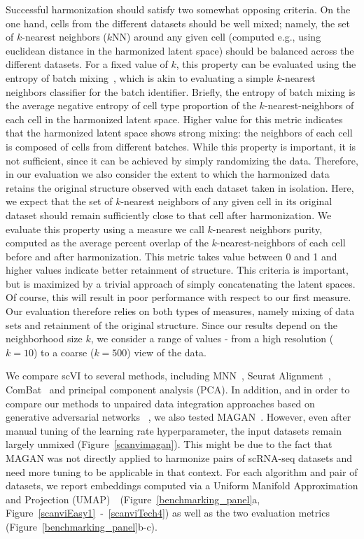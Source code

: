 Successful harmonization should satisfy two somewhat opposing criteria. On the one hand, cells from the different datasets should be well mixed; namely, the set of $k$-nearest neighbors ($k$NN) around any given cell (computed e.g., using euclidean distance in the harmonized latent space) should be balanced across the different datasets. For a fixed value of $k$, this property can be evaluated using the entropy of batch mixing~\cite{MNN}, which is akin to evaluating a simple $k$-nearest neighbors classifier for the batch identifier. Briefly, the entropy of batch mixing is the average negative entropy of cell type proportion of the $k$-nearest-neighbors of each cell in the harmonized latent space. Higher value for this metric indicates that the harmonized latent space shows strong mixing: the neighbors of each cell is composed of cells from different batches. While this property is important, it is not sufficient, since it can be achieved by simply randomizing the data. Therefore, in our evaluation we also consider the extent to which the harmonized data retains the original structure observed with each dataset taken in isolation. Here, we expect that the set of $k$-nearest neighbors of any given cell in its original dataset should remain sufficiently close to that cell after harmonization. We evaluate this property using a measure we call $k$-nearest neighbors purity, computed as the average percent overlap of the $k$-nearest-neighbors of each cell before and after harmonization. This metric takes value between 0 and 1 and higher values indicate better retainment of structure. This criteria is important, but is maximized by a trivial approach of simply concatenating the latent spaces. Of course, this will result in poor performance with respect to our first measure. Our evaluation therefore relies on both types of measures, namely mixing of data sets and retainment of the original structure. Since our results depend on the neighborhood size $k$, we consider a range of values - from a high resolution ($k=10$) to a coarse ($k=500$) view of the data. 


We compare scVI to several methods, including MNN~\cite{MNN}, Seurat Alignment~\cite{seurat}, ComBat~\cite{combat} and principal component analysis (PCA). In addition, and in order to compare our methods to unpaired data integration approaches based on generative adversarial networks ~\cite{zhu2017unpaired}, we also tested  MAGAN~\cite{amodio2018magan}. However, even after manual tuning of the learning rate hyperparameter, the input datasets remain largely unmixed (Figure~\ref{scanvimagan}). This might be due to the fact that MAGAN was not directly applied to harmonize pairs of scRNA-seq datasets and need more tuning to be applicable in that context. For each algorithm and pair of datasets, we report embeddings computed via a Uniform Manifold Approximation and Projection (UMAP)~\cite{umap}~(Figure~\ref{benchmarking_panel}a, Figure~\ref{scanviEasy1}~-~\ref{scanviTech4}) as well as the two evaluation metrics (Figure~\ref{benchmarking_panel}b-c).

